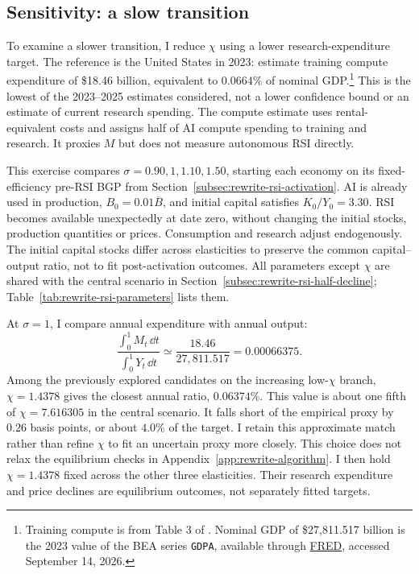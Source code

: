 \subsection{Sensitivity: a slow transition}
\label{subsec:rewrite-rsi-research-share}

To examine a slower transition, I reduce $\chi$ using a lower research-expenditure
target. The reference is the United
States in 2023: \citet{korinekmckelvey2026} estimate training compute
expenditure of \$18.46 billion, equivalent to $0.0664\%$ of nominal
GDP.\footnote{Training compute is from Table 3 of
\citet{korinekmckelvey2026}. Nominal GDP of \$27,811.517 billion is the
2023 value of the BEA series \texttt{GDPA}, available through
\href{https://fred.stlouisfed.org/data/GDPA}{FRED}, accessed September 14, 2026.}
This is the lowest of the 2023--2025 estimates considered, not a lower
confidence bound or an estimate of current research spending. The compute
estimate uses rental-equivalent costs and assigns half of AI compute
spending to training and research. It proxies $M$ but does not measure
autonomous RSI directly.

This exercise compares $\sigma=0.90,1,1.10,1.50$, starting each economy
on its fixed-efficiency pre-RSI BGP from
Section~\ref{subsec:rewrite-rsi-activation}. AI is already used in
production, $B_0=0.01\overline B$, and initial capital satisfies
$K_0/Y_0=3.30$. RSI becomes available unexpectedly at date zero, without
changing the initial stocks, production quantities or prices. Consumption
and research adjust endogenously. The initial capital stocks differ across
elasticities to preserve the common capital--output ratio, not to fit
post-activation outcomes. All parameters except $\chi$ are shared with
the central scenario in Section~\ref{subsec:rewrite-rsi-half-decline};
Table~\ref{tab:rewrite-rsi-parameters} lists them.

At $\sigma=1$, I compare annual expenditure with annual output:
\begin{equation}
 \frac{\int_0^1 M_t\,\dd t}{\int_0^1 Y_t\,\dd t}
 \simeq \frac{18.46}{27{,}811.517}=0.00066375.
 \label{eq:rewrite-research-share-target}
\end{equation}
Among the previously explored candidates on the increasing low-$\chi$
branch, $\chi=1.4378$ gives the closest annual ratio, $0.06374\%$.
This value is about one fifth of $\chi=7.616305$ in the central scenario.
It falls short of the empirical proxy by $0.26$ basis points, or about
$4.0\%$ of the target. I retain this approximate match rather than refine
$\chi$ to fit an uncertain proxy more closely. This choice does not relax
the equilibrium checks in Appendix~\ref{app:rewrite-algorithm}.
I then hold $\chi=1.4378$ fixed across the other three elasticities.
Their research expenditure and price declines are equilibrium outcomes,
not separately fitted targets.


